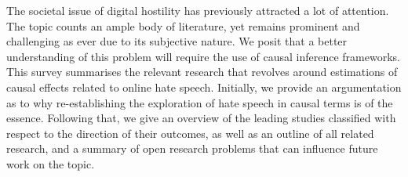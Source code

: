 The societal issue of digital hostility has previously attracted a lot of attention. The topic counts an ample body of literature, yet remains prominent and challenging as ever due to its subjective nature. We posit that a better understanding of this problem will require the use of causal inference frameworks. This survey summarises the relevant research that revolves around estimations of causal effects related to online hate speech. Initially, we provide an argumentation as to why re-establishing the exploration of hate speech in causal terms is of the essence. Following that, we give an overview of the leading studies classified with respect to the direction of their outcomes, as well as an outline of all related research, and a summary of open research problems that can influence future work on the topic.

